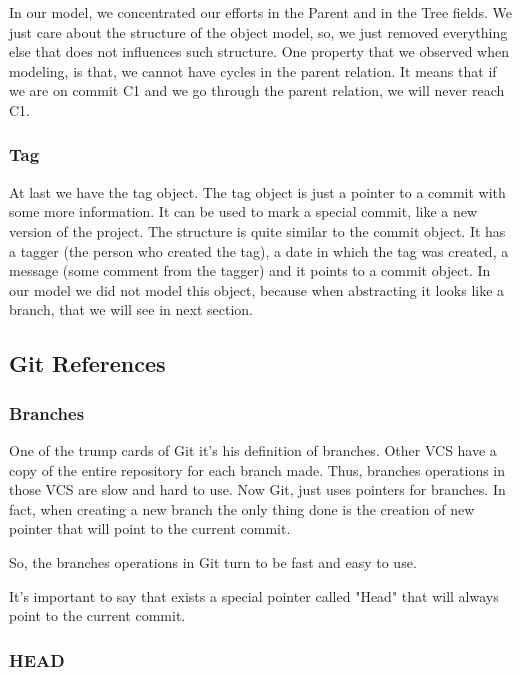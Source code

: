 In our model, we concentrated our efforts in the Parent and in the
Tree fields. We just care about the structure of the object model, so,
we just removed everything else that does not influences such
structure. One property that we observed when modeling, is that, we
cannot have cycles in the parent relation. It means that if we are
on commit C1 and we go through the parent relation, we will never
reach C1.

\subsubsection{Tag}
At last we have the tag object. The tag object is just a pointer to
a commit with some more information. It can be used to mark a special 
commit, like a new version of the project. The structure is quite 
similar to the commit object. It has a tagger (the person who created 
the tag), a date in which the tag was created, a message (some
comment from the tagger) and it points to a commit object. In our
model we did not model this object, because when abstracting it looks
like a branch, that we will see in next section.

\subsection{Git References}


\subsubsection{Branches}
One of the trump cards of Git it's his definition of branches. Other VCS
have a copy of the entire repository for each branch made. Thus, branches
operations in those VCS are slow and hard to use. Now Git, just uses 
pointers for branches. In fact, when creating a new branch the only thing
done is the creation of new pointer that will point to the current commit. \par
So, the branches operations in Git turn to be fast and easy to use. \par
It's important to say that exists a special pointer called "Head" that will 
always point to the current commit. \par

\subsubsection{HEAD}

